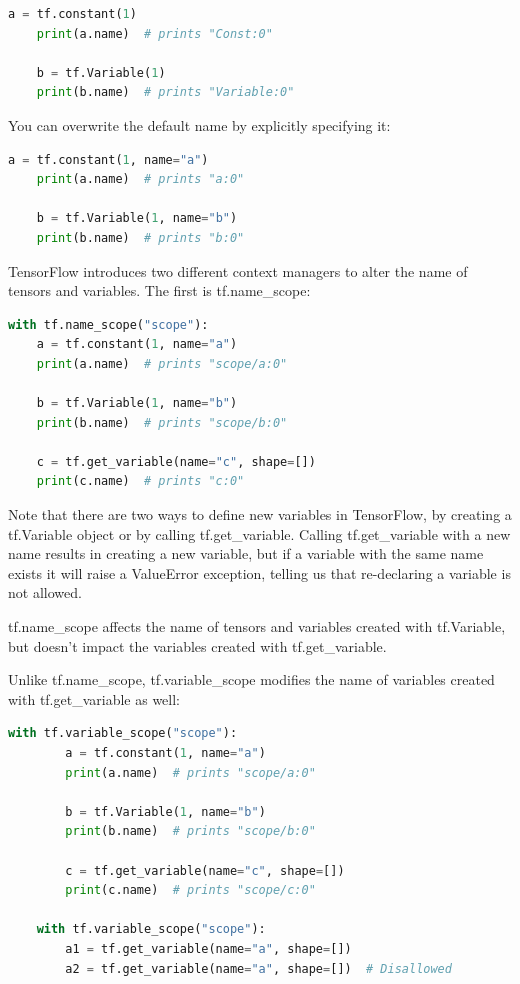 \begin{lstlisting}[language=Python]
    a = tf.constant(1)
    print(a.name)  # prints "Const:0"
    
    b = tf.Variable(1)
    print(b.name)  # prints "Variable:0"
\end{lstlisting}

You can overwrite the default name by explicitly specifying it:

\begin{lstlisting}[language=Python]
    a = tf.constant(1, name="a")
    print(a.name)  # prints "a:0"
    
    b = tf.Variable(1, name="b")
    print(b.name)  # prints "b:0"
\end{lstlisting}

TensorFlow introduces two different context managers to alter the name of tensors and variables. The first is tf.name\_scope:

\begin{lstlisting}[language=Python]
    with tf.name_scope("scope"):
    a = tf.constant(1, name="a")
    print(a.name)  # prints "scope/a:0"
    
    b = tf.Variable(1, name="b")
    print(b.name)  # prints "scope/b:0"
    
    c = tf.get_variable(name="c", shape=[])
    print(c.name)  # prints "c:0"
\end{lstlisting}

Note that there are two ways to define new variables in TensorFlow, by creating a tf.Variable object or by calling tf.get\_variable. Calling tf.get\_variable with a new name results in creating a new variable, but if a variable with the same name exists it will raise a ValueError exception, telling us that re-declaring a variable is not allowed.

tf.name\_scope affects the name of tensors and variables created with tf.Variable, but doesn't impact the variables created with tf.get\_variable.

Unlike tf.name\_scope, tf.variable\_scope modifies the name of variables created with tf.get\_variable as well:

\begin{lstlisting}[language=Python]
    with tf.variable_scope("scope"):
        a = tf.constant(1, name="a")
        print(a.name)  # prints "scope/a:0"
        
        b = tf.Variable(1, name="b")
        print(b.name)  # prints "scope/b:0"
        
        c = tf.get_variable(name="c", shape=[])
        print(c.name)  # prints "scope/c:0"
  
    with tf.variable_scope("scope"):
        a1 = tf.get_variable(name="a", shape=[])
        a2 = tf.get_variable(name="a", shape=[])  # Disallowed
\end{lstlisting}

